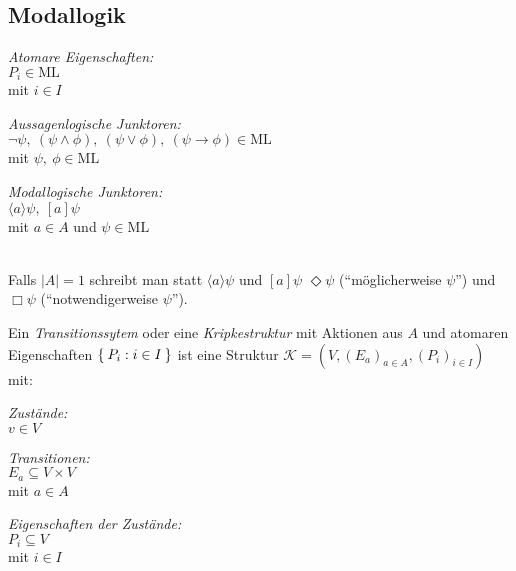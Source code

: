\documentclass[a4paper,parskip=half*,DIV=15,fontsize=11pt]{scrartcl}
\newcommand{\K}{\mathcal{K}}
\newcommand{\ML}{\mathrm{ML}}
\begin{document}
\subsection{Modallogik}

\begin{minipage}[t]{0.3\textwidth}
\begin{center}
\emph{Atomare Eigenschaften:} \\
$P_i \in \ML$ \\
mit $i \in I$
\end{center}
\end{minipage}
\begin{minipage}[t]{0.35\textwidth}
\begin{center}
\emph{Aussagenlogische Junktoren:} \\
$\neg \psi,\ (\psi \land \phi),\ (\psi \lor \phi),\ (\psi \to \phi) \in \ML$ \\
mit $\psi,\ \phi \in \ML$
\end{center}
\end{minipage}
\begin{minipage}[t]{0.35\textwidth}
\begin{center}
\emph{Modallogische Junktoren:} \\
$\langle a \rangle \psi,\ [a] \psi$ \\
mit $a \in A$ und $\psi \in \ML$
\end{center}
\end{minipage}
\ \\

Falls $|A| = 1$ schreibt man statt $\langle a \rangle \psi$ und $[a] \psi$ $\Diamond \psi$ (``möglicherweise $\psi$'') und $\Box \psi$ (``notwendigerweise $\psi$'').

Ein \emph{Transitionssytem} oder eine \emph{Kripkestruktur} mit Aktionen aus $A$ und atomaren Eigenschaften $\Set{P_i : i \in I}$ ist eine Struktur $\K = (V,(E_a)_{a \in A},(P_i)_{i \in I})$ mit:

\begin{minipage}[t]{0.3\textwidth}
\begin{center}
\emph{Zustände:} \\
$v \in V$
\end{center}
\end{minipage}
\begin{minipage}[t]{0.35\textwidth}
\begin{center}
\emph{Transitionen:} \\
$E_a \subseteq V \times V$ \\
mit $a \in A$
\end{center}
\end{minipage}
\begin{minipage}[t]{0.35\textwidth}
\begin{center}
\emph{Eigenschaften der Zustände:} \\
$P_i \subseteq V$ \\
mit $i \in I$
\end{center}
\end{minipage}
\ \\
\end{document}
